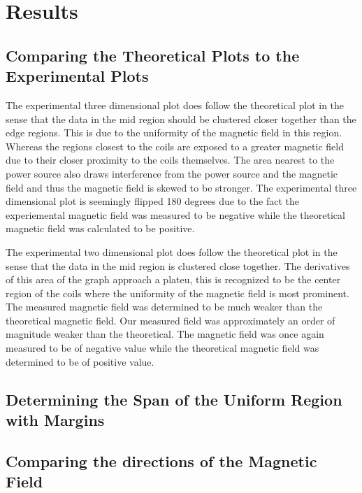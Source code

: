 \documentclass[a4paper]{article}
\begin{document}
\section{Results}
\subsection{Comparing the Theoretical Plots to the Experimental Plots}
The experimental three dimensional plot does follow the theoretical
plot in the sense that the data in the mid region should be clustered
closer together than the edge regions. This is due to the uniformity
of the magnetic field in this region. Whereas the regions closest to
the coils are exposed to a greater magnetic field due to their closer
proximity to the coils themselves. The area nearest to the power
source also draws interference from the power source and the magnetic
field and thus the magnetic field is skewed to be stronger. The
experimental three dimensional plot is seemingly flipped 180 degrees
due to the fact the experiemental magnetic field was measured to be
negative while the theoretical magnetic field was calculated to be
positive.

The experimental two dimensional plot does follow the theoretical plot
in the sense that the data in the mid region is clustered close
together. The derivatives of this area of the graph approach a
plateu, this is recognized to be the center region of the coils where
the uniformity of the magnetic field is most prominent. The measured
magnetic field was determined to be much weaker than the theoretical
magnetic field. Our measured field was approximately an order of
magnitude weaker than the theoretical. The magnetic field was once
again measured to be of negative value while the theoretical magnetic
field was determined to be of positive value.

\subsection{Determining the Span of the Uniform Region with Margins}
\subsection{Comparing the directions of the Magnetic Field}
\end{document}
